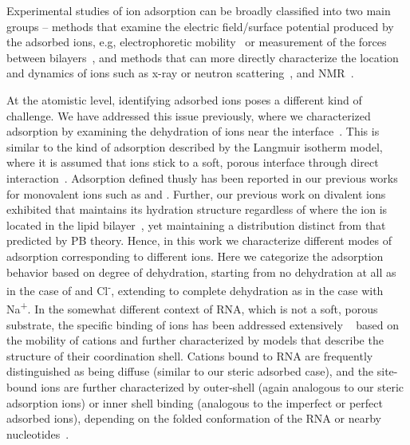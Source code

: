 Experimental studies of ion adsorption can be broadly
classified into two main groups -- methods that examine the electric field/surface potential
produced by the adsorbed ions, e.g, electrophoretic mobility~\cite{smith:2017:zeta} or 
measurement of the forces between 
bilayers~\cite{marra:1985:direct}, and methods
that can more directly characterize the location and dynamics of ions such 
as x-ray or neutron 
scattering~\cite{fogarty:2015,nagle:2000,pan:2012,panff:2012,uhrikova:2008,mason:2006:neutron}, and
NMR~\cite{nagle:2000,venable:2013,casal:1989}. 

At the atomistic level, identifying adsorbed ions poses a different kind of challenge.
We have addressed this issue previously,
where we characterized adsorption by examining the dehydration of ions near the
interface~\cite{kruczek:2019,kruczek:2017,pandit:2003:dppc:na,Berkowitz:2006}.
This is similar to the kind of adsorption described 
by the Langmuir isotherm model, where it is
assumed that ions stick to a soft, porous interface 
through direct interaction~\cite{kalinin:1996:ionbinding}.
Adsorption defined thusly has been reported in our previous works for monovalent ions 
such as \na and {\li}\cite{kruczek:2017,kruczek:2019,saunders:2019,saunders:2022}.
Further, our previous work on divalent ions
exhibited that \mg maintains its 
hydration {structure} regardless of where the ion is located in the 
lipid bilayer~\cite{kruczek:2019}, yet maintaining 
a distribution distinct from that
predicted by PB theory. Hence, {in this work
    we characterize different modes of adsorption corresponding
to different ions. Here we} categorize the 
adsorption behavior based on degree of 
dehydration, starting from no
dehydration at all as in the case of \mg and Cl\textsuperscript{-}, 
extending to complete dehydration as in the case with Na\textsuperscript{+}. 
In {the somewhat different} 
context of RNA, which is not a soft, 
porous substrate, the specific binding of ions has been addressed
extensively
~\cite{bowman:2012,rulivsek:2003:outer,dudev:2003,porschke:1979:mode,petrov:2005}
based on the mobility of cations and further 
characterized by models that describe the 
structure of their coordination shell.
Cations bound to RNA are frequently distinguished as
being diffuse {(similar to our steric adsorbed case)}, and the site-bound ions are further characterized
by outer-shell {(again analogous to our steric adsorption ions)} 
or inner shell binding 
{(analogous to the imperfect or perfect adsorbed ions)}, depending on
the folded conformation of the RNA or 
nearby nucleotides~\cite{bowman:2012,rulivsek:2003:outer,dudev:2003,porschke:1979:mode,petrov:2005}. 

